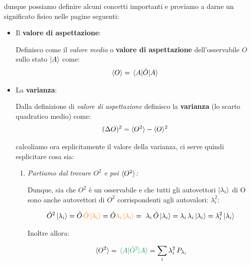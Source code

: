 	dunque possiamo definire alcuni concetti importanti e proviamo a darne un significato fisico nelle pagine seguenti:

\begin{itemize}

	\item Il \textbf{valore di aspettazione}:
\begin{mydef}
	Definisco come il \textit{valore medio} o \textbf{valore di aspettazione} dell'osservabile $O$ sullo stato $\ket{A}$ come:
\begin{align*}
	\langle O \rangle = \mel{A}{\hat{O}}{A}
\end{align*}
\end{mydef}

	\item La \textbf{varianza}:

\begin{mydef}
	Dalla definizione di \textit{valore di aspettazione} definisco la \textbf{varianza} (lo scarto quadratico medio) come:
\begin{align*}
	(\Delta O)^2 = \langle O^2 \rangle - \langle O \rangle^2
\end{align*}
\end{mydef}

	calcoliamo ora esplicitamente il valore della varianza, ci serve quindi esplicitare cosa sia:

\begin{enumerate}[label=\arabic*)]

	\item \textit{Partiamo dal trovare $O^2$ e poi $\langle O^2 \rangle$:}
		
		Dunque, sia che $O^2$ è un osservabile e che tutti gli autovettori $\ket{\lambda_i}$ di O sono anche autovettori di $O^2$ corrispondenti agli autovalori: $\lambda_i^2$:
		
	\begin{align*}
		\hat{O}^2 \ket{\lambda_i} = \hat{O} \, \textcolor{orange}{\hat{O} \ket{\lambda_i}} = \hat{O} \textcolor{orange}{ \lambda_i \ket{\lambda_i} } =  \lambda_i \, \hat{O} \ket{\lambda_i} = \lambda_i \, \lambda_i \ket{\lambda_i } = \lambda_i^2 \ket{\lambda_i}
	\end{align*}
	
		Inoltre allora:
		
	\begin{align*}
		\mean{O^2} = \textcolor{ForestGreen}{\mel{A}{\hat{O}^2}{A}} = \sum_i \lambda_i^2 \, P_{\lambda_i}
	\end{align*}
	

\end{enumerate}
\end{itemize}
